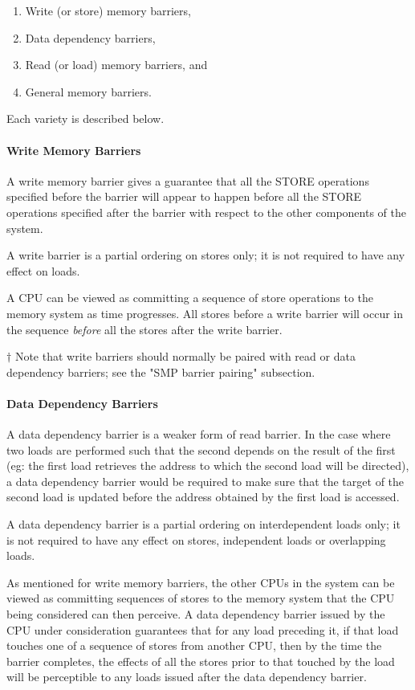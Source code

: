 \begin{enumerate}
\item	Write (or store) memory barriers,
\item	Data dependency barriers,
\item	Read (or load) memory barriers, and
\item	General memory barriers.
\end{enumerate}

Each variety is described below.

\paragraph{Write Memory Barriers}

A write memory barrier gives a guarantee that all the STORE operations
specified before the barrier will appear to happen before all the STORE
operations specified after the barrier with respect to the other
components of the system.

A write barrier is a partial ordering on stores only; it is not required
to have any effect on loads.

A CPU can be viewed as committing a sequence of store operations to the
memory system as time progresses.  All stores before a write barrier will
occur in the sequence \emph{before} all the stores after the write barrier.

$\dagger$ Note that write barriers should normally be paired with read
or data dependency barriers; see the "SMP barrier pairing" subsection.

\paragraph{Data Dependency Barriers}

A data dependency barrier is a weaker form of read barrier.  In the case
where two loads are performed such that the second depends on the result
of the first (eg: the first load retrieves the address to which the second
load will be directed), a data dependency barrier would be required to
make sure that the target of the second load is updated before the address
obtained by the first load is accessed.

A data dependency barrier is a partial ordering on interdependent loads
only; it is not required to have any effect on stores, independent loads
or overlapping loads.

As mentioned for write memory barriers,
the other CPUs in the system can be viewed as
committing sequences of stores to the memory system that the CPU being
considered can then perceive.  A data dependency barrier issued by the CPU
under consideration guarantees that for any load preceding it, if that
load touches one of a sequence of stores from another CPU, then by the
time the barrier completes, the effects of all the stores prior to that
touched by the load will be perceptible to any loads issued after the data
dependency barrier.

